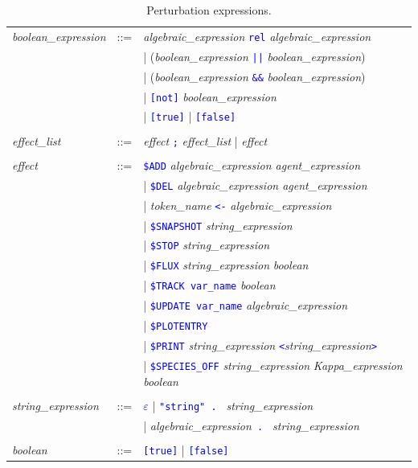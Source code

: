 \documentclass[11pt]{book}
\def\tcb#1{\textcolor{blue}{\ttt{#1}}}
\def\ttt#1{\texttt{#1}}
\def\var#1{{\textquotesingle}#1{\textquotesingle}}
\begin{document}
\begin{table}[htbp]
  \centering
  \caption{Perturbation expressions.}
  \begin{tabular}{@{} lcl @{}}
    \textit{boolean\_expression} &::=& \textit{algebraic\_expression}\index{boolean expression} \tcb{rel} \textit{algebraic\_expression} \\
    && | (\textit{boolean\_expression} \tcb{||} \textit{boolean\_expression}) \\
    && | (\textit{boolean\_expression} \tcb{\&\&} \textit{boolean\_expression}) \\
    && | \tcb{[not]} \textit{boolean\_expression} \\
    && | \tcb{[true]} | \tcb{[false]} \\\\
    \textit{effect\_list} &::=& \textit{effect} \tcb{\ttt {;}} \textit{effect\_list} | \textit{effect} \\\\
\textit{effect} &::=& \tcb{\$ADD} \textit{algebraic\_expression agent\_expression} \\
    && | \tcb{\$DEL} \textit{algebraic\_expression agent\_expression} \\
    && | \textit{token\_name} \tcb{<-} \textit{algebraic\_expression} \\
    && | \tcb{\$SNAPSHOT} \textit{string\_expression}\\
    && | \tcb{\$STOP} \textit{string\_expression}\\
	&& | \tcb{\$FLUX} \textit{string\_expression} \textit{boolean} \\
    && | \tcb{\$TRACK \var{var\_name}} \textit{boolean} \\
    && | \tcb{\$UPDATE \var{var\_name}} \textit{algebraic\_expression} \\
    && | \tcb{\$PLOTENTRY} \\
    && | \tcb{\$PRINT} \textit{string\_expression} \tcb{<}\textit{string\_expression}\tcb{>} \\
    && | \tcb{\$SPECIES\_OFF} \textit{string\_expression} \textit{Kappa\_expression} \textit{boolean} \\
    \\
    \textit{string\_expression} &::=& \tcb{$\varepsilon$} | \tcb{"string" . } \textit{string\_expression} \\
    && | \textit{algebraic\_expression}\tcb{ . } \textit{string\_expression} \\\\
	\textit{boolean} &::=& \tcb{[true]} | \tcb{[false]}
  \end{tabular}
  \label{tab:pert}
\end{table}
\end{document}

